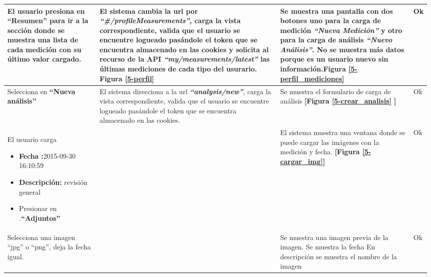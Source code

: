 \begin{longtable}{|m{3.5cm}|m{3.5cm}|m{3.5cm}|m{2.5cm}|}
El usuario presiona en \textbf{``Resumen'' } para ir a la sección donde se muestra una lista de cada medición con su último valor cargado.

& El sistema cambia la url por \textit{\textbf{``\#/profileMeasurements''}}, carga la vista correspondiente, valida que el usuario se encuentre logueado pasándole el token que se encuentra almacenado en las cookies y solicita al recurso de la API \textit{\textbf{``my/measurements/latest'' }}las últimas mediciones de cada tipo del usurario. \textbf{Figura \ref{5-perfil}}

& Se muestra una pantalla con dos botones uno para la carga de medición
\textit{\textbf{``Nueva Medición'' }}y otro para la carga de análisis \textit{\textbf{``Nuevo Análisis''}}. No se muestra más datos porque es un usuario nuevo sin información.\textbf{Figura \ref{5-perfil_mediciones}}
& Ok
\\ \hline



Selecciona en \textbf{``Nueva análisis'' }
& El sistema direcciona a la url \textit{\textbf{``analysis/new''}}, carga la vista correspondiente, valida que el usuario se encuentre logueado pasándole el token que se encuentra almacenado en las cookies.

& Se muestra el formulario de carga de análisis \textbf{[Figura \ref{5-crear_analisis} ]}
& Ok
\\ \hline



El usuario carga

\begin{itemize}
	\item \textbf{Fecha :}2015-09-30 16:10:59
	\item \textbf{Descripción: }revisión general
	\item Presionar en .\textbf{``Adjuntos''}

\end{itemize}

&
& El sistema muestra una ventana donde se puede cargar las imágenes con la medición y fecha.\textbf{ [Figura  \ref{5-cargar_img}]}
&Ok

\\ \hline



Selecciona una imagen ``jpg'' o ``png'', deja la fecha igual. 
&
& Se muestra una imagen previa de la imagen. Se muestra la fecha En descripción se muestra el nombre de la imagen
& Ok
\\ \hline
 

\end{longtable}
